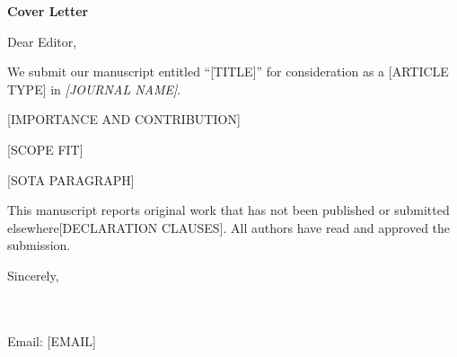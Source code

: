 \documentclass{article}
\begin{document}
\begin{center}
\textbf{\large Cover Letter}
\end{center}

\bigskip

\noindent Dear Editor,

\medskip

We submit our manuscript entitled ``[TITLE]'' for consideration as a [ARTICLE TYPE] in \textit{[JOURNAL NAME]}.

[IMPORTANCE AND CONTRIBUTION]

[SCOPE FIT]

[SOTA PARAGRAPH]

This manuscript reports original work that has not been published or submitted elsewhere[DECLARATION CLAUSES]. All authors have read and approved the submission.

\bigskip

\noindent Sincerely,

\medskip

\\
[DEPARTMENT, UNIVERSITY, CITY, COUNTRY]\\
Email: [EMAIL]
\end{document}

